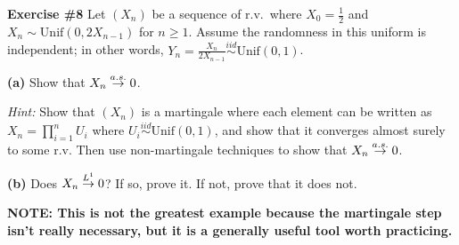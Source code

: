 \begin{tcolorbox}
    \textbf{Exercise \#8}
    Let $(X_n)$ be a sequence of r.v.\ where 
    $X_0 = \frac{1}{2}$ and $X_n \sim \text{Unif}(0, 2 X_{n-1})$ for $n \geq 1$.
    Assume the randomness in this uniform is independent; in other words,
    $Y_n = \frac{X_n}{2X_{n-1}} \stackrel{iid}{\sim} \text{Unif}(0,1)$.

    \textbf{(a)} Show that $X_n \overset{a.s.}{\rightarrow} 0$.

    \textit{Hint:} Show that $(X_n)$ is a martingale where each element can be
    written as $X_n = \prod_{i=1}^{n} U_i$ where $U_i \stackrel{iid}{\sim} \text{Unif}(0,1)$,
    and show that it converges almost surely to some r.v.
    Then use non-martingale techniques to show that $X_n \overset{a.s.}{\rightarrow} 0$.

    \textbf{(b)} Does $X_n \overset{L^{1}}{\rightarrow} 0$? If so, prove it. If not, prove that it does not.

    \textbf{NOTE: This is not the greatest example because the martingale step isn't really necessary,
    but it is a generally useful tool worth practicing.}
\end{tcolorbox}

